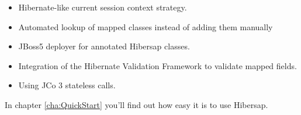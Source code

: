 \begin{itemize}
  \item Hibernate-like current session context strategy.
  \item Automated lookup of mapped classes instead of adding them manually
  \item JBoss5 deployer for annotated Hibersap classes.
  \item Integration of the Hibernate Validation Framework to validate mapped fields.  
  \item Using JCo 3 stateless calls.
\end{itemize}

In chapter \ref{cha:QuickStart} you'll find out how easy it is to use Hibersap.

